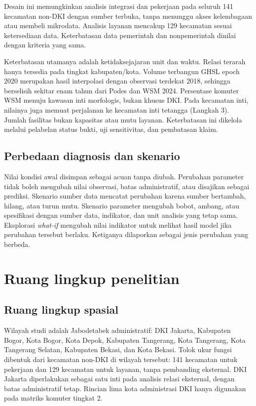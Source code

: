 \documentclass[12pt,a4paper,oneside,openany,indonesian]{report}
\begin{document}
Desain ini memungkinkan analisis integrasi dan pekerjaan pada seluruh
141 kecamatan non-DKI dengan sumber terbuka, tanpa menunggu akses
kelembagaan atau membeli mikrodata. Analisis layanan mencakup 129
kecamatan sesuai ketersediaan data. Keterbatasan data pemerintah dan
nonpemerintah dinilai dengan kriteria yang sama.

Keterbatasan utamanya adalah ketidaksejajaran unit dan waktu. Relasi
terarah hanya tersedia pada tingkat kabupaten/kota. Volume terbangun
GHSL epoch 2020 merupakan hasil interpolasi dengan observasi terdekat
2018, sehingga berselisih sekitar enam tahun dari Podes dan WSM 2024.
Persentase komuter WSM menuju kawasan inti morfologis, bukan khusus
DKI. Pada kecamatan inti, nilainya juga memuat perjalanan ke kecamatan inti tetangga (Langkah 3). Jumlah fasilitas bukan kapasitas atau mutu layanan. Keterbatasan
ini dikelola melalui pelabelan status bukti, uji sensitivitas, dan
pembatasan klaim.

\subsection{Perbedaan diagnosis dan
skenario}\label{perbedaan-diagnosis-dan-skenario}

Nilai kondisi awal disimpan sebagai acuan tanpa diubah. Perubahan
parameter tidak boleh mengubah nilai observasi, batas administratif,
atau disajikan sebagai prediksi. Skenario sumber data mencatat perubahan
karena sumber bertambah, hilang, atau turun mutu. Skenario parameter
mengubah bobot, ambang, atau spesifikasi dengan sumber data, indikator,
dan unit analisis yang tetap sama. Eksplorasi \emph{what-if} mengubah
nilai indikator untuk melihat hasil model jika perubahan tersebut
berlaku. Ketiganya dilaporkan sebagai jenis perubahan yang berbeda.

\section{Ruang lingkup penelitian}\label{ruang-lingkup-penelitian}

\subsection{Ruang lingkup spasial}\label{ruang-lingkup-spasial}

Wilayah studi adalah Jabodetabek administratif: DKI Jakarta, Kabupaten
Bogor, Kota Bogor, Kota Depok, Kabupaten Tangerang, Kota Tangerang, Kota
Tangerang Selatan, Kabupaten Bekasi, dan Kota Bekasi. Tolok ukur fungsi
dibentuk dari kecamatan non-DKI di wilayah tersebut: 141 kecamatan
untuk pekerjaan dan 129 kecamatan untuk layanan, tanpa pembanding
eksternal. DKI Jakarta diperlakukan sebagai satu inti pada
analisis relasi eksternal, dengan batas administratif tetap. Rincian
lima kota administrasi DKI hanya digunakan pada matriks komuter tingkat
2.
\end{document}
